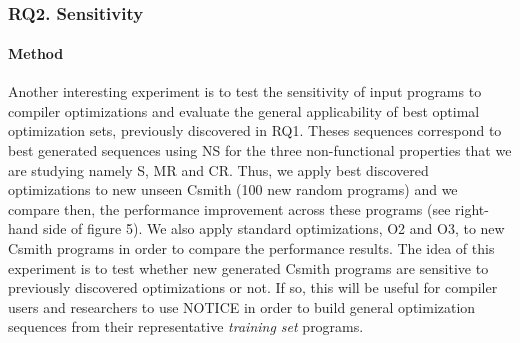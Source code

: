 


\noindent{}\\
\subsubsection{RQ2. Sensitivity}
\paragraph{Method}
Another interesting experiment is to test the sensitivity of input programs to compiler optimizations and evaluate the general applicability of best optimal optimization sets, previously discovered in RQ1. Theses sequences correspond to best generated sequences using NS for the three non-functional properties that we are studying namely S, MR and CR. 
Thus, we apply best discovered optimizations to new unseen Csmith (100 new random programs) and we compare then, the performance improvement across these programs (see right-hand side of figure 5). We also apply standard optimizations, O2 and O3, to new Csmith programs in order to compare the performance results.
The idea of this experiment is to test whether new generated Csmith programs are sensitive to previously discovered optimizations or not. If so, this will be useful for compiler users and researchers to use NOTICE in order to build general optimization sequences from their representative \textit{training set} programs.
